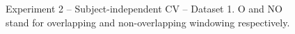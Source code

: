 \documentclass[sensors,article,submit,moreauthors,pdftex]{Definitions/mdpi}
\begin{document}
\begin{figure}[htp]
   \caption{Experiment 2 -- Subject-independent CV -- Dataset 1. O and NO stand for overlapping and non-overlapping windowing respectively.}
    \label{fig:exp2_ds1}
    
\end{figure}

\begin{figure}[htp]
  \centering
  \quad

\end{figure}
\end{document}
